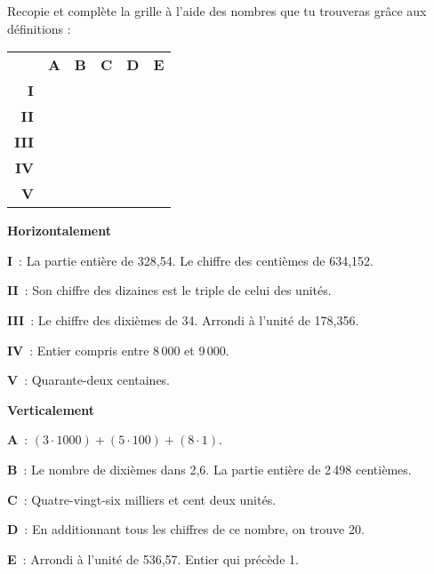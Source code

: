 \begin{exercice}
Recopie et complète la grille à l'aide des nombres que tu trouveras grâce aux définitions :

\begin{center}
\begin{tabularx}{.5\linewidth}{r|c|c|c|c|c|}
\multicolumn{1}{c}{}& \multicolumn{1}{c}{\textbf{A}} & \multicolumn{1}{c}{\textbf{B}} & \multicolumn{1}{c}{\textbf{C}} & \multicolumn{1}{c}{\textbf{D}} & \multicolumn{1}{c}{\textbf{E}} \\ \cline{2-6}
\textbf{I} & & & & \cellcolor{black} & \\ \cline{2-6} 
\textbf{II} & & & & & \\ \cline{2-6} 
\textbf{III} & & \cellcolor{black} & & & \\ \cline{2-6} 
\textbf{IV} & & & & & \cellcolor{black} \\ \cline{2-6} 
\textbf{V} & \cellcolor{black} & & & & \\ \cline{2-6} 
\end{tabularx}
\end{center}

\vspace{0.75em}

\textbf{Horizontalement}

\textbf{I} : La partie entière de 328,54. Le chiffre des centièmes de 634,152.

\textbf{II} : Son chiffre des dizaines est le triple de celui des unités.

\textbf{III} : Le chiffre des dixièmes de 34. Arrondi à l'unité de 178,356.

\textbf{IV} : Entier compris entre 8\,000 et 9\,000.

\textbf{V} : Quarante-deux centaines.

\vspace{0.75em}

\textbf{Verticalement}

\textbf{A} : $(3 \cdot 1 000) + (5 \cdot 100) + (8 \cdot 1)$.

\textbf{B} : Le nombre de dixièmes dans 2,6. La partie entière de 2\,498 centièmes.

\textbf{C} : Quatre-vingt-six milliers et cent deux unités.

\textbf{D} : En additionnant tous les chiffres de ce nombre, on trouve 20.

\textbf{E} : Arrondi à l'unité de 536,57. Entier qui précède 1.

\end{exercice}


